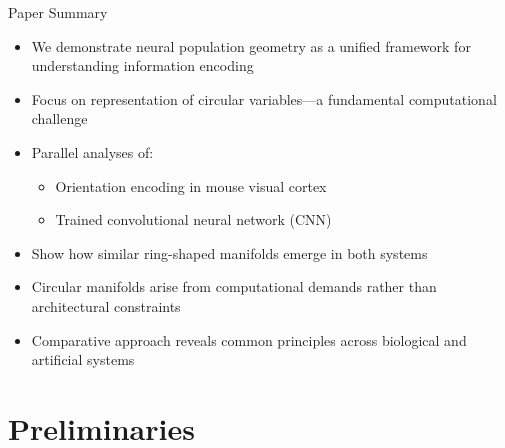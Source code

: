 \documentclass[aspectratio=169]{beamer}
\begin{document}
\begin{frame}{Paper Summary}
    \begin{itemize}
        \item We demonstrate neural population geometry as a unified framework for understanding information encoding
        \item Focus on representation of circular variables—a fundamental computational challenge
        \item Parallel analyses of:
        \begin{itemize}
            \item Orientation encoding in mouse visual cortex
            \item Trained convolutional neural network (CNN)
        \end{itemize}
        \item Show how similar ring-shaped manifolds emerge in both systems
        \item Circular manifolds arise from computational demands rather than architectural constraints
        \item Comparative approach reveals common principles across biological and artificial systems
    \end{itemize}
\end{frame}

\section{Preliminaries}
\end{document}
